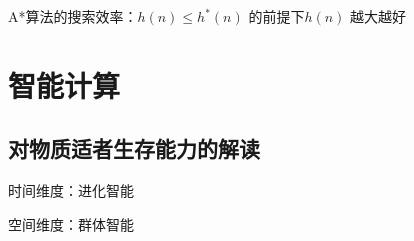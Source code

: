 \begin{notation}
    A*算法的搜索效率：$h\left( n \right) \le h^*\left( n \right) $ 的前提下$h\left( n \right) $ 越大越好
\end{notation}
\section{智能计算}%
\label{sec:智能计算}
\subsection{对物质适者生存能力的解读}%
\label{sub:对物质适者生存能力的解读}
时间维度：进化智能

空间维度：群体智能

